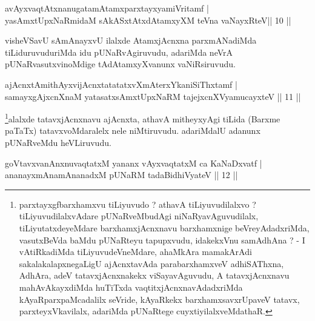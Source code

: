 \begin{shl}
\footnotemark[2]{}avAyxvaqtAtxnanugatamAtamxparxtayxyamiVritamf  | \\
yasAmxtUpxNaRmidaM sAkASxtAtxdAtamxyXM teVna vaNayxRteV\hfill ||  10 ||  
\end{shl}

\begin{artha}
visheVSavU sAmAnayxvU ilalxde AtamxjAcnxna parxmANadiMda tiLiduruvuduriMda idu pUNaRvAgiruvudu, adariMda neVrA pUNaRvasutxvinoMdige tAdAtamxyXvanunx vaNiRsiruvudu.
\end{artha}

\begin{shl}
ajAcnxtAmithAyxvijAcnxtatatatxvXmAterxYkaniSiThxtamf  | \\
samayxgAjxcnXnaM yatasatxsAmxtUpxNaRM tajejxcnXVyamucayxteV \hfill||  11 ||  
\end{shl}


\begin{artha}
\footnote{parxtayxgfbarxhamxvu tiLiyuvudo ? athavA tiLiyuvudilalxvo ? tiLiyuvudilalxvAdare pUNaRveMbudAgi niNaRyavAguvudilalx, tiLiyutatxdeyeMdare barxhamxjAcnxnavu barxhamxnige beVreyAdadxriMda, vasutxBeVda baMdu pUNaRteyu tapupxvudu, idakekxVnu  samAdhAna ? - I vAtiRkadiMda tiLiyuvudeVneMdare, ahaMkAra mamakArAdi sakalakalapxnegaLigU ajAcnxtavAda parabarxhamxveV adhiSAThxna, AdhAra, adeV tatavxjAcnxnakekx viSayavAguvudu, A tatavxjAcnxnavu mahAvAkayxdiMda huTiTxda vaqtitxjAcnxnavAdadxriMda kAyaRparxpaMcadalilx seVride, kAyaRkekx barxhamxsavxrUpaveV tatavx, parxteyxVkavilalx, adariMda pUNaRtege cuyxtiyilalxveMdathaR.}alalxde tatavxjAcnxnavu ajAcnxta, athavA mitheyxyAgi tiLida (Barxme paTaTx) tatavxvoMdaralelx nele niMtiruvudu. adariMdalU adanunx pUNaRveMdu heVLiruvudu.
\end{artha}


\begin{shl}
goVtavxvanAnxnuvaqtatxM yananx vAyxvaqtatxM ca KaNaDxvatf  | \\
ananayxmAnamAnanadxM  pUNaRM tadaBidhiVyateV \hfill||  12 ||  
\end{shl}

